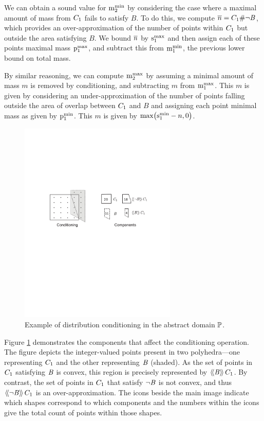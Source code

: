 We can obtain a sound value for $\mathrm{m}^\mathrm{min}_{2}$ by considering the case
where a maximal amount of mass from $C_{1}$ fails to satisfy
$B$.  To do this, we compute $\overline{n} =
C_{1} \# \neg\mathit{B}$, which provides an
over-approximation of the number of points within $C_{1}$ but
outside the area satisfying $B$.  We bound $\overline{n}$ by $\mathrm{s}^\mathrm{max}_{1}$ and
then assign each of these points maximal mass $\mathrm{p}^\mathrm{max}_{1}$, and subtract
this from $\mathrm{m}^\mathrm{min}_{1}$, the previous lower bound on total mass.

By similar reasoning, we can compute $\mathrm{m}^\mathrm{max}_{2}$ by assuming a minimal
amount of mass $m$ is removed by conditioning, and subtracting $m$
from $\mathrm{m}^\mathrm{max}_{1}$.  This $m$ is given by considering an
under-approximation of the number of points falling outside the area
of overlap between $C_{1}$ and $B$ and assigning each point
minimal mass as given by $\mathrm{p}^\mathrm{min}_{1}$.  This $m$ is given by
$\max\bigl( \mathrm{s}^\mathrm{min}_{1}-n, 0 \bigr)$.

\begin{figure}
\begin{center}
\includegraphics[width=7.5cm]{figures/conditioning-smaller.pdf}
\end{center}
\caption{\label{fig:conditioning} Example of distribution conditioning in the abstract domain $\mathbb{P}$.}
\end{figure}

Figure \ref{fig:conditioning} demonstrates the components that affect the
conditioning operation.  The figure depicts the integer-valued points
present in two polyhedra---one representing $C_{1}$ and the other
representing $\mathit{B}$ (shaded).  As the set of points in $C_{1}$
satisfying $\mathit{B}$ is convex, 
this region is precisely represented by $\langle\!\langle{\mathit{B}}\rangle\!\rangle\,{C_{1}}$.  By contrast, the set of points
in $C_{1}$ that satisfy $\neg\mathit{B}$ is not convex, and thus $\langle\!\langle{\neg\mathit{B}}\rangle\!\rangle\,{C_{1}}$ is an
over-approximation.  The icons
beside the main image indicate which shapes correspond to which components
and the numbers within the icons give the total count of points within those
shapes.

